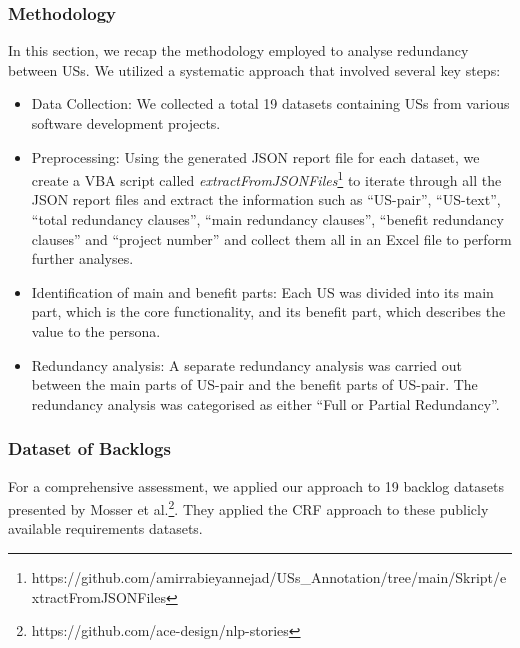 \subsubsection*{Methodology}
In this section, we recap the methodology employed to analyse redundancy between USs. We utilized a systematic approach that involved several key steps:
\begin{itemize}
	
	\item Data Collection: We collected a total 19 datasets containing USs from various software development projects.
	
	\item Preprocessing: Using the generated JSON report file for each dataset, we create a VBA script called \textit{extractFromJSONFiles}\footnote{https://github.com/amirrabieyannejad/USs\_Annotation/tree/main/Skript/extractFromJSONFiles} to iterate through all the JSON report files and extract the information such as \enquote{US-pair}, \enquote{US-text}, \enquote{total redundancy clauses}, \enquote{main redundancy clauses}, \enquote{benefit redundancy clauses} and \enquote{project number} and collect them all in an Excel file to perform further analyses.
	
	\item Identification of main and benefit parts: Each US was divided into its main part, which is the core functionality, and its benefit part, which describes the value to the persona.
	
	\item Redundancy analysis: A separate redundancy analysis was carried out between the main parts of US-pair and the benefit parts of US-pair. The redundancy analysis was categorised as either \enquote{Full or Partial Redundancy}.
	
	
	
\end{itemize}
\subsubsection*{Dataset of Backlogs}
For a comprehensive assessment, we applied our approach to 19 backlog datasets presented by Mosser et al.\footnote{https://github.com/ace-design/nlp-stories}. They applied the CRF approach to these publicly available requirements datasets\cite{requirementsdatasets}.

